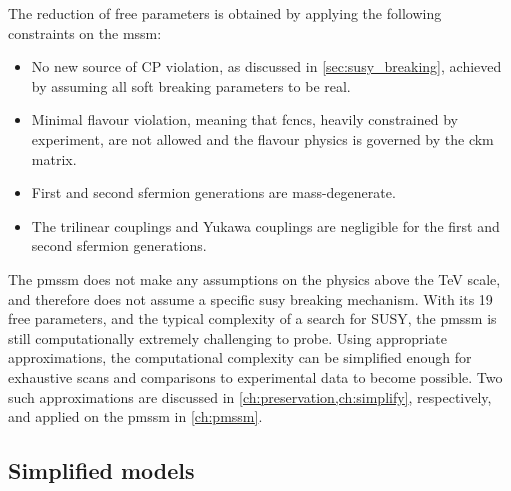 The reduction of free parameters is obtained by applying the following constraints on the \gls{mssm}:
\begin{itemize}
	\item No new source of CP violation, as discussed in \cref{sec:susy_breaking}, achieved by assuming all soft breaking parameters to be real.
	\item Minimal flavour violation, meaning that \glspl{fcnc}, heavily constrained by experiment, are not allowed and the flavour physics is governed by the \gls{ckm} matrix.
	\item First and second sfermion generations are mass-degenerate.
	\item The trilinear couplings and Yukawa couplings are negligible for the first and second sfermion generations.
\end{itemize}
The \gls{pmssm} does not make any assumptions on the physics above the TeV scale, and therefore does not assume a specific \gls{susy} breaking mechanism. With its 19 free parameters, and the typical complexity of a search for SUSY, the \gls{pmssm} is still computationally extremely challenging to probe. Using appropriate approximations, the computational complexity can be simplified enough for exhaustive scans and comparisons to experimental data to become possible. Two such approximations are discussed in \cref{ch:preservation,ch:simplify}, respectively, and applied on the \gls{pmssm} in \cref{ch:pmssm}.

\subsection{Simplified models}\label{sec:simplified_models}


